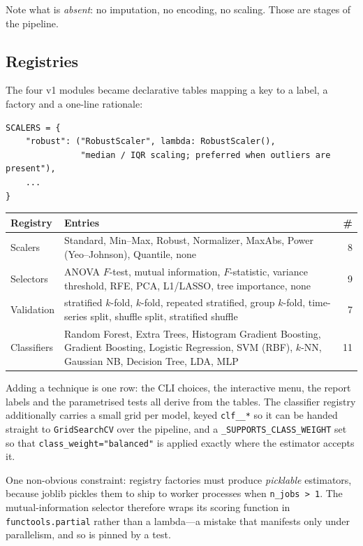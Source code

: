 \documentclass[11pt,a4paper]{article}
\begin{document}
Note what is \emph{absent}: no imputation, no encoding, no scaling. Those are
stages of the pipeline.

\subsection{Registries}
\label{sec:registries}

The four v1 modules became declarative tables mapping a key to a label, a
factory and a one-line rationale:

\begin{lstlisting}
SCALERS = {
    "robust": ("RobustScaler", lambda: RobustScaler(),
               "median / IQR scaling; preferred when outliers are present"),
    ...
}
\end{lstlisting}

\begin{center}
\begin{tabularx}{\textwidth}{L{2.4cm} X r}
\toprule
\textbf{Registry} & \textbf{Entries} & \textbf{\#} \\
\midrule
Scalers & Standard, Min--Max, Robust, Normalizer, MaxAbs, Power (Yeo--Johnson), Quantile, none & 8 \\
Selectors & ANOVA $F$-test, mutual information, $F$-statistic, variance threshold, RFE, PCA, L1/LASSO, tree importance, none & 9 \\
Validation & stratified $k$-fold, $k$-fold, repeated stratified, group $k$-fold, time-series split, shuffle split, stratified shuffle & 7 \\
Classifiers & Random Forest, Extra Trees, Histogram Gradient Boosting, Gradient Boosting, Logistic Regression, SVM (RBF), $k$-NN, Gaussian NB, Decision Tree, LDA, MLP & 11 \\
\bottomrule
\end{tabularx}
\end{center}

Adding a technique is one row: the CLI choices, the interactive menu, the
report labels and the parametrised tests all derive from the tables. The
classifier registry additionally carries a small grid per model, keyed
\texttt{clf\_\_*} so it can be handed straight to \texttt{GridSearchCV} over the
pipeline, and a \texttt{\_SUPPORTS\_CLASS\_WEIGHT} set so that
\texttt{class\_weight="balanced"} is applied exactly where the estimator
accepts it.

One non-obvious constraint: registry factories must produce \emph{picklable}
estimators, because joblib pickles them to ship to worker processes when
\texttt{n\_jobs > 1}. The mutual-information selector therefore wraps its
scoring function in \texttt{functools.partial} rather than a lambda---a mistake
that manifests only under parallelism, and so is pinned by a test.
\end{document}
